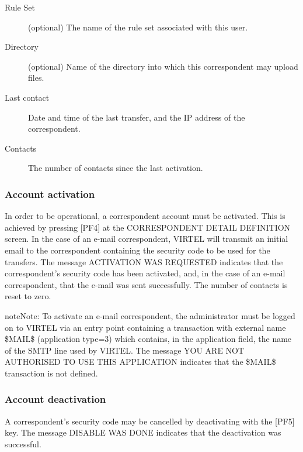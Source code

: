 \documentclass[letterpaper,10pt,english]{sphinxmanual}
\begin{document}
\begin{description}
\begin{quote}
\begin{description}
\end{description}
\end{quote}

\item[{Rule Set}] \leavevmode
(optional) The name of the rule set associated with this user.

\item[{Directory}] \leavevmode
(optional) Name of the directory into which this correspondent may upload files.

\item[{Last contact}] \leavevmode
Date and time of the last transfer, and the IP address of the correspondent.

\item[{Contacts}] \leavevmode
The number of contacts since the last activation.

\end{description}


\subsubsection{Account activation}
\label{\detokenize{User_Guide:v457ug-account-activation}}\label{\detokenize{User_Guide:account-activation}}
In order to be operational, a correspondent account must be activated. This is achieved by pressing {[}PF4{]} at the CORRESPONDENT DETAIL DEFINITION screen. In the case of an e-mail correspondent, VIRTEL will transmit an initial email to the correspondent containing the security code to be used for the transfers. The message ACTIVATION WAS REQUESTED indicates that the correspondent’s security code has been activated, and, in the case of an e-mail
correspondent, that the e-mail was sent successfully. The number of contacts is reset to zero.

\begin{sphinxadmonition}{note}{Note:}
To activate an e-mail correspondent, the administrator must be logged on to VIRTEL via an entry point containing a transaction with external name \$MAIL\$ (application type=3) which contains, in the application field, the name of the SMTP line used by VIRTEL. The message YOU ARE NOT AUTHORISED TO USE THIS APPLICATION indicates that the \$MAIL\$ transaction is not defined.
\end{sphinxadmonition}


\subsubsection{Account deactivation}
\label{\detokenize{User_Guide:account-deactivation}}
A correspondent’s security code may be cancelled by deactivating with the {[}PF5{]} key. The message DISABLE WAS DONE indicates that the deactivation was successful.
\end{document}
